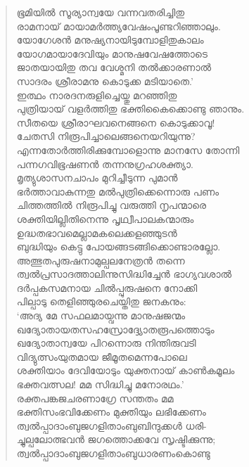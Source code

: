 \begin{verse}
ഭൂമിയില്‍ സൂര്യാന്വയേ വന്നവതരിച്ചിതു\\
രാമനായ് മായാമര്‍ത്ത്യവേഷംപൂണ്ടറിഞ്ഞാലും.\\
യോഗേശന്‍ മനുഷ്യനായിടുമ്പോളിതുകാലം\\
യോഗമായാദേവിയും മാനുഷവേഷത്തോടെ\\
ജാതയായിതു തവ വേശ്മനി തല്‍ക്കാരണാല്‍\\
സാദരം ശ്രീരാമനു കൊടുക്ക മടിയാതെ.’\\
ഇത്ഥം നാരദനരുളിച്ചെയ്തു മറഞ്ഞിതു\\
പുത്രിയായ് വളര്‍ത്തിതു ഭക്തികൈക്കൊണ്ടു ഞാനും.\\
സീതയെ ശ്രീരാഘവനെങ്ങനെ കൊടുക്കാവൂ!\\
ചേതസി നിരൂപിച്ചാലെങ്ങനെയറിയുന്നു?\\
എന്നതോര്‍ത്തിരിക്കുമ്പോളൊന്നു മാനസേ തോന്നി\\
പന്നഗവിഭൂഷണന്‍ തന്നനുഗ്രഹശക്ത്യാ.\\
മൃത്യുശാസനചാപം മുറിച്ചീടുന്ന പുമാന്‍\\
ഭര്‍ത്താവാകുന്നതു മല്‍പുത്രിക്കെന്നൊരു പണം\\
ചിത്തത്തില്‍ നിരൂപിച്ചു വരുത്തി നൃപന്മാരെ\\
ശക്തിയില്ലിതിനെന്നു പൃഥ്വീപാലകന്മാരും\\
ഉദ്ധതഭാവമെല്ലാമകലെക്കളഞ്ഞുടന്‍\\
ബുദ്ധിയും കെട്ടു പോയങ്ങടങ്ങിക്കൊണ്ടാരല്ലോ.\\
അത്ഭുതപുരുഷനാമുല്പലനേത്രന്‍ തന്നെ\\
ത്വല്‍പ്രസാദത്താലിന്നുസിദ്ധിച്ചേന്‍ ഭാഗ്യവശാല്‍\\
ദര്‍പ്പകസമനായ ചില്‍പ്പുരുഷനെ നോക്കി\\
പില്പാടു തെളിഞ്ഞുരചെയ്തിതു ജനകനും:\\
‘അദ്യ മേ സഫലമായ്വന്നു മാനുഷജന്മം\\
ഖദ്യോതായതസഹസ്രോദ്ദ്യോതരൂപത്തൊടും\\
ഖദ്യോതാന്വയേ പിറന്നൊരു നിന്തിരുവടി\\
വിദ്യുത്സംയുതമായ ജീമൂതമെന്നപോലെ\\
ശക്തിയാം ദേവിയോടും യുക്തനായ് കാണ്‍കമൂലം\\
ഭക്തവത്സല! മമ സിദ്ധിച്ചു മനോരഥം.’\\
രക്തപങ്കജചരണാഗ്രേ സന്തതം മമ\\
ഭക്തിസംഭവിക്കേണം മുക്തിയും ലഭിക്കേണം\\
ത്വല്‍പ്പാദാംബുജഗളിതാംബുബിന്ദുക്കള്‍ ധരി-\\
ച്ചുല്പലോത്ഭവന്‍ ജഗത്തൊക്കവേ സൃഷ്ടിക്കുന്നു;\\
ത്വല്‍പ്പാദാംബുജഗളിതാംബുധാരണംകൊണ്ടു\\

\end{verse}
